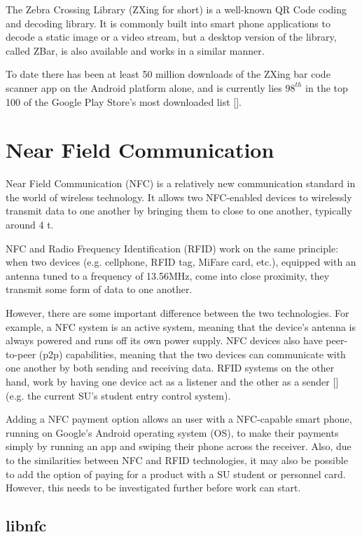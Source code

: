 The Zebra Crossing Library (ZXing for short) is a well-known QR Code coding and decoding
library.
It is commonly built into smart phone applications to decode a static image or a video stream,
but a desktop version of the library, called ZBar, is also available and works in a similar
manner. 

To date there has been at least 50 million downloads of the ZXing
bar code scanner app on the Android platform alone, and is currently lies $98^{th}$ in the top
100 of the Google Play Store's most downloaded list [\cite{website:barcodescanner}].

\section{Near Field Communication}

Near Field Communication (NFC) is a relatively new communication standard in the world of
wireless technology. It allows two NFC-enabled devices to wirelessly transmit data to one
another by bringing them to close to one another, typically around 4 t. 

NFC and Radio Frequency Identification (RFID) work on the same principle: when two
devices  (e.g. cellphone, RFID tag, MiFare card, etc.), equipped with an antenna tuned to a
frequency  of 13.56MHz, come into close proximity, they transmit some form of data to one another.

However, there are some important difference between the two technologies. For example, a NFC
system is  an active system, meaning that the device's antenna is always powered and runs off
its own  power supply. NFC devices also have peer-to-peer (p2p) capabilities, meaning that the
two  devices can communicate with one another by both sending and receiving data. RFID systems
on the  other hand, work by having one device act as a listener and the other as a
sender [\cite{website:diff-nfc-rfid}] (e.g. the current SU's student entry control system).

Adding a NFC payment option allows an user with a
NFC-capable smart phone, running on Google's Android operating system (OS), to make their
payments simply  by running an app and swiping their phone across the receiver. Also, due to
the  similarities between NFC and RFID technologies, it may also be possible to add the option
of paying for a product with a SU student or personnel card. However, this needs to be
investigated further before work can start.

\subsection{libnfc}

